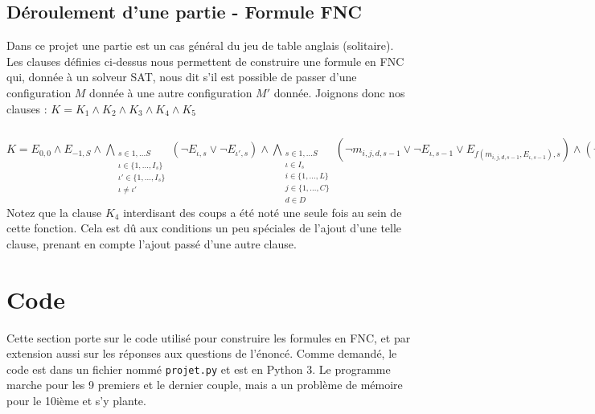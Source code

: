 \documentclass[utf8]{article}
\begin{document}
\subsection{Déroulement d'une partie - Formule FNC}
Dans ce projet une partie est un cas général du jeu de table anglais (solitaire). Les clauses définies ci-dessus nous permettent de construire une formule en FNC qui, donnée à un solveur SAT, nous dit s'il est possible de passer d'une configuration $M$ donnée à une autre configuration $M'$ donnée.
Joignons donc nos clauses : \newline
$K = K_1 \wedge K_2 \wedge K_3 \wedge K_4 \wedge K_5$ \newline
$K = E_{0,0} \wedge E_{-1,S} \wedge {\underset{\substack{s\in{1,...S}\\\iota\in\{1,...,I_s\}\\\iota'\in\{1,...,I_s\}\\\iota \neq \iota'}}{\bigwedge}}(\neg E_{\iota,s} \vee \neg E_{\iota',s}) \wedge {\underset{\substack{s\in{1,...S}\\\iota\in I_s\\i\in\{1,...,L\}\\j \in\{1,...,C\}\\d \in D}}{\bigwedge}}(\neg m_{i,j,d,s-1}\vee \neg E_{\iota,s-1}\vee E_{f(m_{i,j,d,s-1},E_{\iota,s-1}),s}) \wedge (\neg m_{i,j,d,s}\vee \neg E_{\iota,s}) \wedge {\underset{s \in \{1,...,S\}}{\bigwedge}}({\underset{\substack{i \in \{1,...,L\} \\ j \in \{1,...,C\} \\ d \in D}}{\bigvee}}m_{i,j,d,s})$ \newline
Notez que la clause $K_4$ interdisant des coups a été noté une seule fois au sein de cette fonction. Cela est dû aux conditions un peu spéciales de l'ajout d'une telle clause, prenant en compte l'ajout passé d'une autre clause.
\newpage

\section{Code}
Cette section porte sur le code utilisé pour construire les formules en FNC, et par extension aussi sur les réponses aux questions de l'énoncé.
Comme demandé, le code est dans un fichier nommé \verb|projet.py| et est en Python 3.  \newline
Le programme marche pour les 9 premiers et le dernier couple, mais a un problème de mémoire pour le 10ième et s'y plante. \newline
\end{document}
